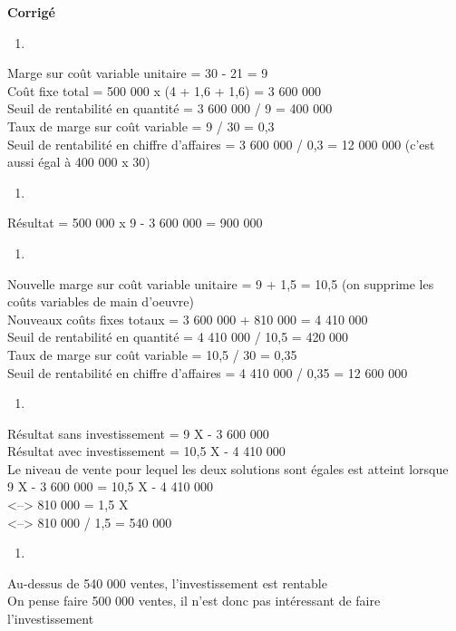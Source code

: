 \documentclass{tufte-handout}
\begin{document}
\begin{enumerate}
\textbf{Corrigé}\\
\begin{enumerate}
\item 
\end{enumerate}
Marge sur coût variable unitaire = 30 - 21 = 9\\
Coût fixe total = 500 000 x (4 + 1,6 + 1,6) = 3 600 000\\
Seuil de rentabilité en quantité = 3 600 000 / 9 = 400 000\\
Taux de marge sur coût variable = 9 / 30 = 0,3\\
Seuil de rentabilité en chiffre d'affaires = 3 600 000 / 0,3 = 12 000 000 (c'est aussi égal à 400 000 x 30)\\
\begin{enumerate}
\item 
\end{enumerate}
Résultat = 500 000 x 9 - 3 600 000 = 900 000\\
\begin{enumerate}
\item 
\end{enumerate}
Nouvelle marge sur coût variable unitaire = 9 + 1,5 = 10,5 (on supprime les coûts variables de main d'oeuvre)\\
Nouveaux coûts fixes totaux = 3 600 000 + 810 000 = 4 410 000\\
Seuil de rentabilité en quantité = 4 410 000 / 10,5 = 420 000\\
Taux de marge sur coût variable = 10,5 / 30 = 0,35\\
Seuil de rentabilité en chiffre d'affaires = 4 410 000 / 0,35 = 12 600 000\\
\begin{enumerate}
\item 
\end{enumerate}
Résultat sans investissement  = 9 X - 3 600 000\\
Résultat avec investissement = 10,5 X - 4 410 000\\
Le niveau de vente pour lequel les deux solutions sont égales est atteint lorsque\\
9 X - 3 600 000 = 10,5 X - 4 410 000\\
<--> 810 000 = 1,5 X\\
<--> 810 000 / 1,5 = 540 000\\
\begin{enumerate}
\item 
\end{enumerate}
Au-dessus de 540 000 ventes, l'investissement est rentable\\
On pense faire 500 000 ventes, il n'est donc pas intéressant de faire l'investissement\\


\end{enumerate}
\end{document}
